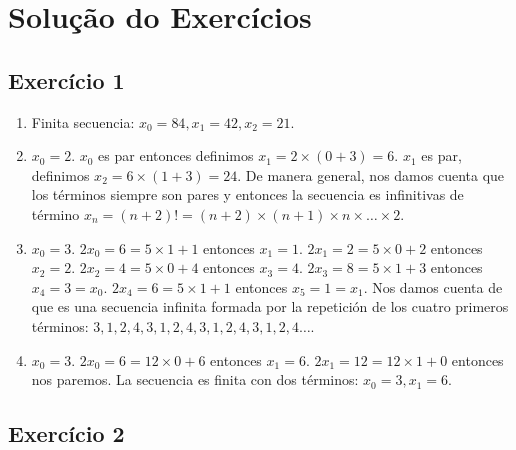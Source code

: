 \section{Solução do Exercícios}

\subsection*{Exercício 1}

\begin{enumerate}
\item Finita secuencia: $x_0 = 84, x_1=42, x_2 = 21$.
\item $x_0 = 2$. $x_0$ es par entonces definimos $x_1 = 2 \times {(0+3)} = 6$.
  $x_1$ es par, definimos $x_2 = 6 \times {(1+3)} = 24$. De manera general,
  nos damos cuenta que los términos siempre son pares y entonces la secuencia
  es infinitivas de término $x_n = {(n+2)}! =
  {(n+2)} \times {(n+1)} \times n \times \ldots \times 2$.
\item $x_0 = 3$. $2 x_0 = 6 = 5 \times 1 + 1$ entonces $x_1 = 1$.
  $2 x_1 = 2 = 5 \times 0 + 2$ entonces $x_2 = 2$.
  $2 x_2 = 4 = 5 \times 0 + 4$ entonces $x_3 = 4$.
  $2 x_3 = 8 = 5 \times 1 + 3$ entonces $x_4 = 3 = x_0$.
  $2 x_4 = 6 = 5 \times 1 + 1$ entonces $x_5 = 1 = x_1$. Nos damos cuenta de
  que es una secuencia infinita formada por la repetición de los cuatro primeros
  términos: $3,1,2,4,3,1,2,4,3,1,2,4,3,1,2,4\ldots$.
\item $x_0 = 3$. $2 x_0 = 6 = 12 \times 0 + 6$ entonces $x_1 = 6$.
  $2 x_1 = 12 = 12 \times 1 + 0$ entonces nos paremos. La secuencia es finita
  con dos términos: $x_0=3, x_1=6$.
\end{enumerate}

\subsection*{Exercício 2}

